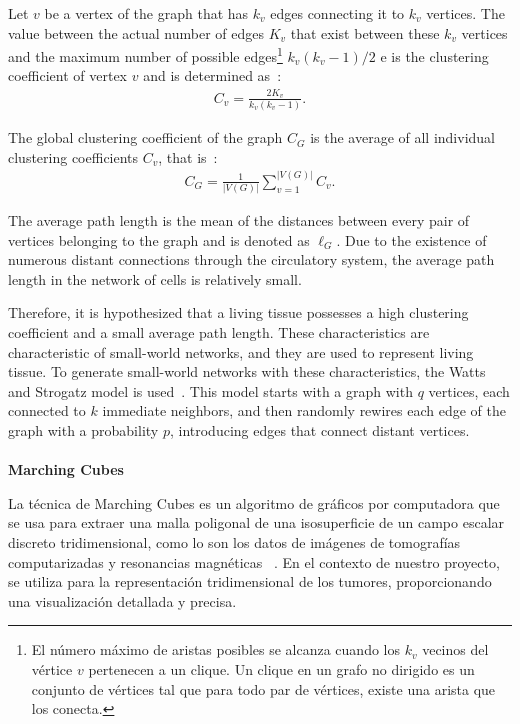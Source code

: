 \documentclass[a4paper,11pt]{article}
\begin{document}
{Let $v$ be a vertex of the graph that has $k_v$ edges connecting it to $k_v$ vertices. The value between the actual number of edges $K_v$ that exist between these $k_v$ vertices and the maximum number of possible edges\footnote{El n\'umero m\'aximo de aristas posibles se alcanza cuando los $k_v$ vecinos del v\'ertice $v$ pertenecen a un clique. Un clique en un grafo no dirigido es un conjunto de v\'ertices tal que para todo par de v\'ertices, existe una arista que los conecta.} $k_v(k_v-1)/2$ e is the clustering coefficient of vertex $v$ and is determined as~\cite{Darien Tesis}:
\begin{align}
C_v = \displaystyle\frac{2K_v}{k_v(k_v-1)}. \label{eq-clustering}
\end{align}

The global clustering coefficient of the graph $C_G$ is the average of all individual clustering coefficients $C_v$, that is~\cite{Darien Tesis}:
\begin{align}
C_G = \displaystyle\frac{1}{|V(G)|}\sum _{v=1} ^{|V(G)|} C_v. \label{eq-global-clustering}
\end{align}

The average path length is the mean of the distances between every pair of vertices belonging to the graph and is denoted as $\ell_G$. Due to the existence of numerous distant connections through the circulatory system, the average path length in the network of cells is relatively small.

Therefore, it is hypothesized that a living tissue possesses a high clustering coefficient and a small average path length. These characteristics are characteristic of small-world networks, and they are used to represent living tissue. To generate small-world networks with these characteristics, the Watts and Strogatz model is used~\cite{31}. This model starts with a graph with $q$ vertices, each connected to $k$ immediate neighbors, and then randomly rewires each edge of the graph with a probability $p$, introducing edges that connect distant vertices.\\
\\
\textbf{Marching Cubes}

La técnica de Marching Cubes es un algoritmo de gráficos por computadora que se usa para extraer una malla poligonal de una isosuperficie de un campo escalar discreto tridimensional, como lo son los datos de imágenes de tomografías computarizadas y resonancias magnéticas ~\cite{7}. En el contexto de nuestro proyecto, se utiliza para la representación tridimensional de los tumores, proporcionando una visualización detallada y precisa.

}
\end{document}

